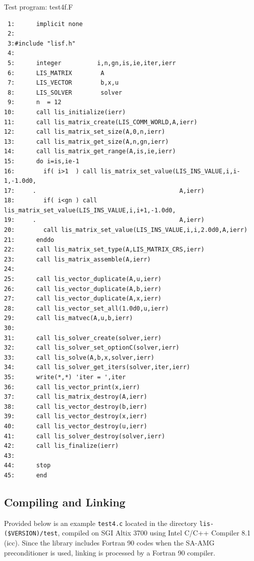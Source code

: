 \documentclass[a4paper]{article}
\begin{document}
\begin{itembox}[l]{Test program: test4f.F}
{\small
\begin{verbatim}
 1:      implicit none
 2:      
 3:#include "lisf.h"
 4:
 5:      integer          i,n,gn,is,ie,iter,ierr
 6:      LIS_MATRIX        A
 7:      LIS_VECTOR        b,x,u
 8:      LIS_SOLVER        solver
 9:      n  = 12
10:      call lis_initialize(ierr)
11:      call lis_matrix_create(LIS_COMM_WORLD,A,ierr)
12:      call lis_matrix_set_size(A,0,n,ierr)
13:      call lis_matrix_get_size(A,n,gn,ierr)
14:      call lis_matrix_get_range(A,is,ie,ierr)
15:      do i=is,ie-1
16:        if( i>1  ) call lis_matrix_set_value(LIS_INS_VALUE,i,i-1,-1.0d0,
17:     .                                        A,ierr)
18:        if( i<gn ) call lis_matrix_set_value(LIS_INS_VALUE,i,i+1,-1.0d0,
19:     .                                        A,ierr)
20:        call lis_matrix_set_value(LIS_INS_VALUE,i,i,2.0d0,A,ierr)
21:      enddo
22:      call lis_matrix_set_type(A,LIS_MATRIX_CRS,ierr)
23:      call lis_matrix_assemble(A,ierr)
24:
25:      call lis_vector_duplicate(A,u,ierr)
26:      call lis_vector_duplicate(A,b,ierr)
27:      call lis_vector_duplicate(A,x,ierr)
28:      call lis_vector_set_all(1.0d0,u,ierr)
29:      call lis_matvec(A,u,b,ierr)
30:
31:      call lis_solver_create(solver,ierr)
32:      call lis_solver_set_optionC(solver,ierr)
33:      call lis_solve(A,b,x,solver,ierr)
34:      call lis_solver_get_iters(solver,iter,ierr)
35:      write(*,*) 'iter = ',iter
36:      call lis_vector_print(x,ierr)
37:      call lis_matrix_destroy(A,ierr)
38:      call lis_vector_destroy(b,ierr)
39:      call lis_vector_destroy(x,ierr)
40:      call lis_vector_destroy(u,ierr)
41:      call lis_solver_destroy(solver,ierr)
42:      call lis_finalize(ierr)
43:
44:      stop
45:      end
\end{verbatim}
}
\end{itembox}
\subsection{Compiling and Linking}
Provided below is an example {\tt test4.c} located in
the directory \verb|lis-($VERSION)/test|, 
compiled on SGI Altix 3700 using Intel C/C++ Compiler 8.1 (icc). 
Since the library includes Fortran 90 codes when the SA-AMG preconditioner is used, linking is processed by a Fortran 90 compiler.
\end{document}
